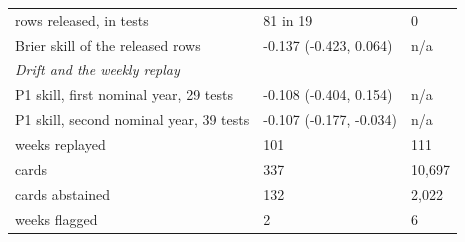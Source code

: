 \begin{tabular}{lll}
rows released, in tests & 81 in 19 & 0 \\
Brier skill of the released rows & -0.137 (-0.423, 0.064) & n/a \\
\midrule
\multicolumn{3}{l}{\emph{Drift and the weekly replay}} \\
P1 skill, first nominal year, 29 tests & -0.108 (-0.404, 0.154) & n/a \\
P1 skill, second nominal year, 39 tests & -0.107 (-0.177, -0.034) & n/a \\
weeks replayed & 101 & 111 \\
cards & 337 & 10,697 \\
cards abstained & 132 & 2,022 \\
weeks flagged & 2 & 6 \\

\end{tabular}
